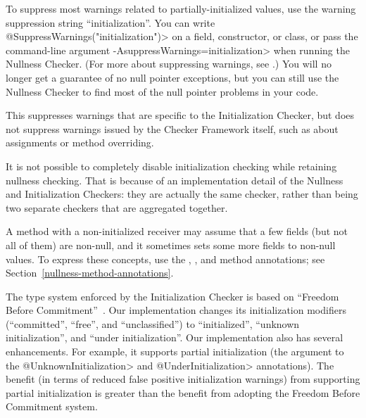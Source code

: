 
To suppress most warnings related to partially-initialized values, use the
warning suppression string ``initialization''.
You can write \<@SuppressWarnings("initialization")>
on a field, constructor, or
class, or pass the command-line argument
\<-AsuppressWarnings=initialization> when
running the Nullness Checker.
(For more about suppressing warnings, see
.)  You will no longer get a guarantee
of no null pointer exceptions, but you can still use the Nullness Checker
to find most of the null pointer problems in your code.

This suppresses warnings that are specific to the Initialization Checker,
but does not suppress warnings issued by the Checker Framework itself, such
as about assignments or method overriding.

It is not possible to completely disable initialization checking while
retaining nullness checking.  That is because
of an implementation detail of the Nullness and Initialization Checkers:
they are actually the same checker, rather than being two separate checkers
that are aggregated together.





A method with a non-initialized receiver may assume that a few fields (but not all
of them) are non-null, and it sometimes sets some more fields to non-null
values.  To express these concepts, use the
,
, and
 method annotations;
see Section~\ref{nullness-method-annotations}.



The type system enforced by the Initialization Checker is based on
``Freedom Before Commitment''~\cite{SummersM2011}.  Our implementation
changes its initialization modifiers (``committed'', ``free'', and
``unclassified'') to ``initialized'', ``unknown initialization'', and
``under initialization''.  Our implementation also has several
enhancements.  For example, it supports partial initialization (the
argument to the \<@UnknownInitialization> and \<@UnderInitialization>
annotations).  The benefit (in terms of reduced false positive
initialization warnings) from supporting partial initialization is
greater than the benefit from adopting the Freedom Before Commitment system.




